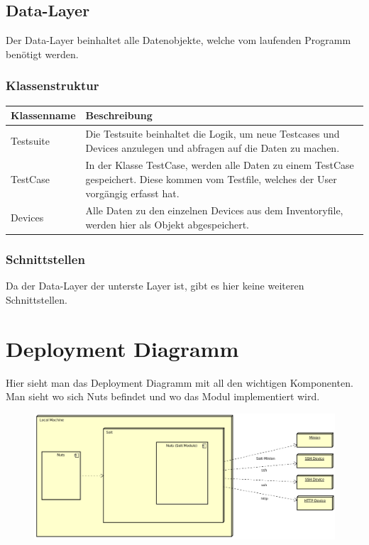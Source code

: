 \documentclass[a4,12pt]{scrartcl}
\begin{document}
\subsection{Data-Layer}
Der Data-Layer beinhaltet alle Datenobjekte, welche vom laufenden Programm benötigt werden.
\subsubsection{Klassenstruktur}
\begin{table}[H]
\centering
    \begin{tabular}{@{}l p{11cm} @{}}\toprule    
    {Klassenname} & {Beschreibung}\\ \midrule
    
    Testsuite & Die Testsuite beinhaltet die Logik, um neue Testcases und Devices anzulegen und abfragen auf die Daten zu machen.\\     
    TestCase & In der Klasse TestCase, werden alle Daten zu einem TestCase gespeichert. Diese kommen vom Testfile, welches der User vorgängig erfasst hat.\\         
    Devices & Alle Daten zu den einzelnen Devices aus dem Inventoryfile, werden hier als Objekt abgespeichert.\\
  
    \bottomrule
    \end{tabular}
\end{table}
\subsubsection{Schnittstellen}
Da der Data-Layer der unterste Layer ist, gibt es hier keine weiteren Schnittstellen.
\newpage
\section{Deployment Diagramm}
Hier sieht man das Deployment Diagramm mit all den wichtigen Komponenten. Man sieht wo sich Nuts befindet und wo das Modul implementiert wird.
\begin{figure} [H]
	\begin{center}
	\includegraphics[width=1\textwidth]{./pictures/DeploymentDiagram.png}
	\label{Bild Referenz}
	\end{center}
\end{figure}
\end{document}
